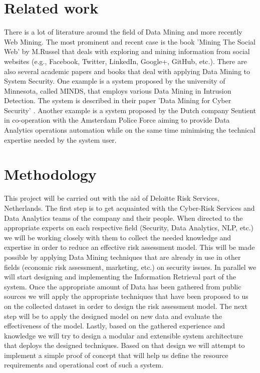 \documentclass[12pt]{article}
\begin{document}
\section{Related work}
There is a lot of literature around the field of Data Mining and more recently Web Mining. The most prominent and recent case is the book 'Mining The Social Web' by M.Russel \cite{socialweb} that deals with exploring and mining information from social websites (e.g., Facebook, Twitter, LinkedIn, Google+, GitHub, etc.). There are also several academic papers and books that deal with applying Data Mining to System Security. One example is a system proposed by the university of Minnesota, called MINDS, that employs various Data Mining in Intrusion Detection. The system is described in their paper 'Data Mining for Cyber Security' \cite{minds}.  Another example is a system proposed by the Dutch company Sentient in co-operation with the Amsterdam Police Force \cite{police} aiming to provide Data Analytics operations automation while on the same time minimising the technical expertise needed by the system user. 

\section{Methodology}
This project will be carried out with the aid of Deloitte Risk Services, Netherlands. The first step is to get acquainted with the Cyber-Risk Services and Data Analytics teams of the company and their people. When directed to the appropriate experts on each respective field (Security, Data Analytics, NLP, etc.) we will be working closely with them to collect the needed knowledge and expertise in order to reduce an effective risk assessment model. This will be made possible by applying Data Mining techniques that are already in use in other fields (economic risk assessment, marketing, etc.) on security issues. In parallel we will start designing and implementing the Information Retrieval part of the system. Once the appropriate amount of Data has been gathered from public sources we will apply the appropriate techniques that have been proposed to us on the collected dataset in order to design the risk assessment model. The next step will be to apply the designed model on new data and evaluate the effectiveness of the model. Lastly, based on the gathered experience and knowledge we will try to design a modular and extensible system architecture that deploys the designed techniques. Based on that design we will attempt to implement a simple proof of concept that will help us define the resource requirements and operational cost of such a system. 
\end{document}
